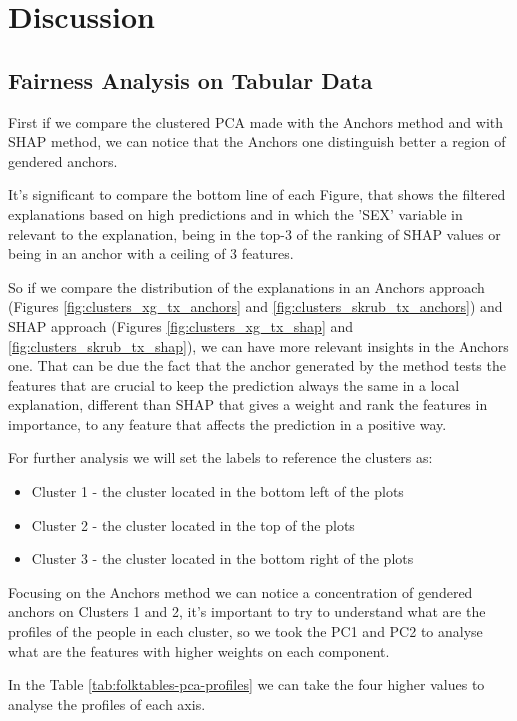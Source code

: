 \section{Discussion}
\subsection{Fairness Analysis on Tabular Data}
First if we compare the clustered PCA made with the Anchors method and with SHAP method, we can notice that the Anchors one distinguish better a region of gendered anchors.

It's significant to compare the bottom line of each Figure, that shows the filtered explanations based on high predictions and in which the 'SEX' variable in relevant to the explanation, being in the top-3 of the ranking of SHAP values or being in an anchor with a ceiling of 3 features.

So if we compare the distribution of the explanations in an Anchors approach (Figures \ref{fig:clusters_xg_tx_anchors} and \ref{fig:clusters_skrub_tx_anchors}) and SHAP approach (Figures \ref{fig:clusters_xg_tx_shap} and \ref{fig:clusters_skrub_tx_shap}), we can have more relevant insights in the Anchors one. That can be due the fact that the anchor generated by the method tests the features that are crucial to keep the prediction always the same in a local explanation, different than SHAP that gives a weight and rank the features in importance, to any feature that affects the prediction in a positive way.

For further analysis we will set the labels to reference the clusters as:
\begin{itemize}
    \item Cluster 1 - the cluster located in the bottom left of the plots
    \item Cluster 2 - the cluster located in the top of the plots
    \item Cluster 3 - the cluster located in the bottom right of the plots
\end{itemize}

Focusing on the Anchors method we can notice a concentration of gendered anchors on Clusters 1 and 2, it's important to try to understand what are the profiles of the people in each cluster, so we took the PC1 and PC2 to analyse what are the features with higher weights on each component.



In the Table \ref{tab:folktables-pca-profiles} we can take the four higher values to analyse the profiles of each axis.

